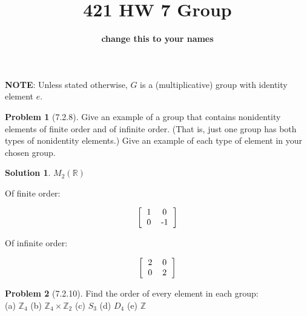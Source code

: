 \documentclass[12pt]{article}
\theoremstyle{definition}
\newtheorem*{prob}{Problem}
\newtheorem*{soln}{Solution}
\newcommand{\ZZ}{{\mathbb{Z}}}
\newcommand{\RR}{{\mathbb{R}}}
\begin{document}
%
\title{421 HW 7 Group}
\author{\textbf{change this to your names}}

\date{}

\maketitle

\textbf{NOTE}: Unless stated otherwise, $G$ is a (multiplicative) 
group with identity element $e$.



\begin{prob}[7.2.8]
Give an example of  a group that contains nonidentity elements of  
finite order and of  infinite order. (That is, just one group
has both types of nonidentity elements.) Give an example of each type of element
in your chosen group.
\end{prob}

\begin{soln}\quad

$M_2(\RR)$

Of finite order:

\begin{equation*}
\left[
\begin{tabular}{c c}
1 & 0\\
0 & -1
\end{tabular}
\right]
\end{equation*}

Of infinite order:

\begin{equation*}
\left[
\begin{tabular}{c c}
2 & 0\\
0 & 2
\end{tabular}
\right]
\end{equation*}

\end{soln}

\begin{prob}[7.2.10]
Find the order of  every element in each group:\\
(a) $\ZZ_4$ \quad    (b) $\ZZ_4 \times \ZZ_2$ \quad    (c) $S_3$  
\quad    (d) $D_4$  \quad   (e) $\ZZ$
\end{prob}
\end{document}
